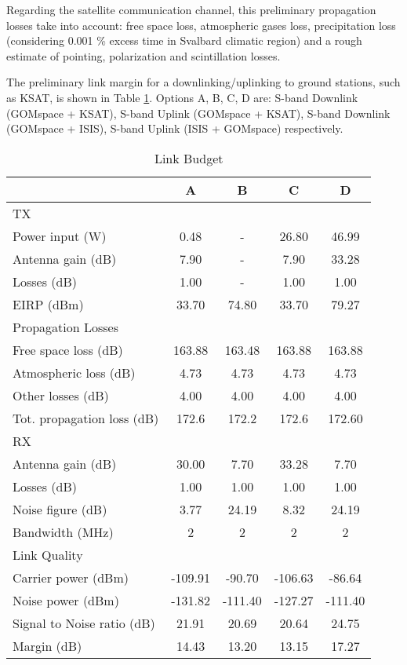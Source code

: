 Regarding the satellite communication channel, this preliminary propagation losses take into account: free space loss, atmospheric gases loss, precipitation loss (considering 0.001 \% excess time in Svalbard climatic region) and a rough estimate of pointing, polarization and scintillation losses.

The preliminary link margin for a \hypso downlinking/uplinking to ground stations, such as KSAT, is shown in Table \ref{tab:link}. Options A, B, C, D are: S-band Downlink (GOMspace + KSAT), S-band Uplink (GOMspace + KSAT), S-band Downlink (GOMspace + ISIS), S-band Uplink (ISIS + GOMspace) respectively.



\begin{table}[htbp]
	\caption{Link Budget}
	\label{tab:link}
	\centering
		\begin{tabular}{|l|c|c|c|c|}
			\hline
			& A			&	 B	&	C	& D  \\ 
			\hline 															
		 TX & & & &\\
		\hline
		 Power input (W) & 0.48 & - & 26.80 & 46.99 \\
		Antenna gain (dB) & 7.90 & - & 7.90 & 33.28\\
		Losses (dB) & 1.00 & - & 1.00 & 1.00 \\
		EIRP (dBm) & 33.70 & 74.80 & 33.70 & 79.27 \\
		\hline
		Propagation Losses & & & & \\
		\hline
		Free space loss	(dB)	& 163.88	& 163.48	& 163.88  & 163.88\\
		Atmospheric loss (dB)	& 4.73 &	4.73	& 4.73 & 4.73 \\
		Other losses	(dB)	& 4.00 &	4.00 & 	4.00 & 4.00 \\
		Tot. propagation loss (dB) &	172.6	& 172.2	& 172.6 & 172.60 \\
			\hline
			RX & & & & \\
			\hline
			Antenna gain	(dB)	& 30.00 & 7.70 & 33.28 & 7.70\\
			Losses	(dB) & 1.00 & 1.00	& 1.00 & 1.00\\
			Noise figure	(dB) &	3.77	& 24.19	& 8.32 & 24.19\\
			Bandwidth	(MHz) &	2 &	2 &	2 & 2 \\
			\hline
			Link Quality & & & & \\
			\hline
			Carrier power	(dBm)& -109.91 & -90.70 &	-106.63 & -86.64\\
			Noise power	(dBm) &	-131.82 &	-111.40	& -127.27 & -111.40\\
			Signal to Noise ratio	(dB)	& 21.91	& 20.69	& 20.64 & 24.75 \\
			Margin	(dB)	& 14.43	& 13.20	& 13.15 & 17.27\\
			\hline
		\end{tabular}
\end{table}
